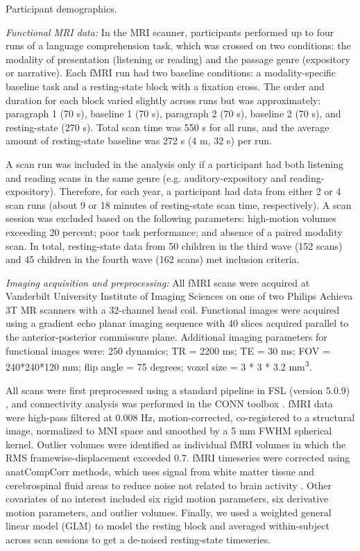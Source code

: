 \begin{table}
    \renewcommand{\tabcolsep}{0.09cm}
    \centering
    
    \caption{Participant demographics.}
    \label{table:ch4-participants}
\end{table}

\emph{Functional MRI data:} In the MRI scanner, participants performed up to four runs of a language comprehension task, which was crossed on two conditions: the modality of presentation (listening or reading) and the passage genre (expository or narrative).  Each fMRI run had two baseline conditions: a modality-specific baseline task and a resting-state block with a fixation cross. The order and duration for each block varied slightly across runs but was approximately: paragraph 1 (70 s), baseline 1 (70 s), paragraph 2 (70 s), baseline 2 (70 s), and resting-state (270 s). Total scan time was 550 s for all runs, and the average amount of resting-state baseline was 272 s (4 m, 32 s) per run.

A scan run was included in the analysis only if a participant had both listening and reading scans in the same genre (e.g. auditory-expository and reading-expository). Therefore, for each year, a participant had data from either 2 or 4 scan runs (about 9 or 18 minutes of resting-state scan time, respectively). A scan session was excluded based on the following parameters: high-motion volumes exceeding 20 percent; poor task performance; and absence of a paired modality scan. In total, resting-state data from 50 children in the third wave (152 scans) and 45 children in the fourth wave (162 scans) met inclusion criteria. 

\emph{Imaging acquisition and preprocessing: } All fMRI scans were acquired at Vanderbilt University Institute of Imaging Sciences on one of two Philips Achieva 3T MR scanners with a 32-channel head coil. Functional images were acquired using a gradient echo planar imaging sequence with 40 slices acquired parallel to the anterior-posterior commissure plane. Additional imaging parameters for functional images were: 250 dynamics; TR = 2200 ms; TE = 30 ms; FOV = 240*240*120 mm; flip angle = 75 degrees; voxel size = 3 * 3 * 3.2 mm\textsuperscript{3}.

All scans were first preprocessed using a standard pipeline in FSL (version 5.0.9) \citep{Jenkinson2012}, and connectivity analysis was performed in the CONN toolbox \citep{WhitfieldGabrieli2012}. fMRI data were high-pass filtered at 0.008 Hz, motion-corrected, co-registered to a structural image, normalized to MNI space and smoothed by a 5 mm FWHM spherical kernel. Outlier volumes were identified as individual fMRI volumes in which the RMS framewise-displacement exceeded 0.7. fMRI timeseries were corrected using anatCompCorr methods, which uses signal from white matter tissue and cerebrospinal fluid areas to reduce noise not related to brain activity \citep{Chai2012}. Other covariates of no interest included six rigid motion parameters, six derivative motion parameters, and outlier volumes. Finally, we used a weighted general linear model (GLM) to model the resting block and averaged within-subject across scan sessions to get a de-noised resting-state timeseries.

